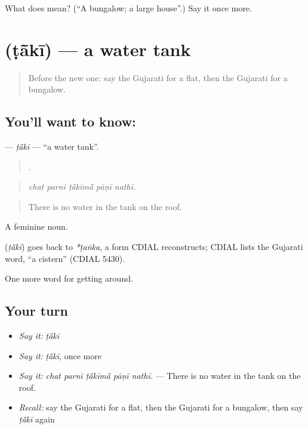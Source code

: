 \begin{tcolorbox}[breakable,colback=teal!4,colframe=teal!35!black,title={Before you move on}]
What does  mean? (\textquotedblleft{}A bungalow; a large house\textquotedblright{}.) Say it once more.
\end{tcolorbox}
\section[\texorpdfstring{\gu{ટાંકી} (ṭā̃kī)}{ટાંકી (ṭā̃kī)}]{ (ṭā̃kī) — a water tank}

\label{lesson:GU-C418-taki}



\begin{quote}
Before the new one: say the Gujarati for a flat, then the Gujarati for a bungalow.
\end{quote}

\subsection*{You'll want to know: }
\textbf{} — \emph{ṭā̃kī} — \textquotedblleft{}a water tank\textquotedblright{}.

\begin{quote}
    .
\end{quote}

\begin{quote}
\emph{chat parnī ṭā̃kīmā̃ pāṇī nathī.}
\end{quote}

\begin{quote}
There is no water in the tank on the roof.
\end{quote}

A feminine noun.

\begin{cousinweb}
\textbf{} (\emph{ṭā̃kī}) goes back to \emph{*ṭaṅka}, a form CDIAL reconstructs; CDIAL lists the Gujarati word, \textquotedblleft{}a cistern\textquotedblright{} (CDIAL 5430).
\end{cousinweb}

\begin{grammarlens}[title={What you've built}]
One more word for getting around.
\end{grammarlens}

\subsection*{Your turn}
\begin{itemize}
\raggedright
  \item \emph{Say it:} \emph{ṭā̃kī}
  \item \emph{Say it:} \emph{ṭā̃kī}, once more
  \item \emph{Say it:} \emph{chat parnī ṭā̃kīmā̃ pāṇī nathī.} — There is no water in the tank on the roof.
  \item \emph{Recall:} say the Gujarati for a flat, then the Gujarati for a bungalow, then say \emph{ṭā̃kī} again
\end{itemize}

